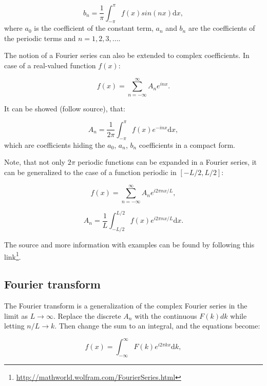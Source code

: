 \documentclass[12pt]{article}
\theoremstyle{plain}
\begin{document}
\begin{equation}
b_n = \frac{1}{\pi} \int_{-\pi}^{\pi} f(x) sin(nx) \text{d}x,
\end{equation}
where $a_0$ is the coefficient of the constant term, $a_n$ and $b_n$ are the coefficients of the periodic terms and $n=1,2,3, ...$.

The notion of a Fourier series can also be extended to complex coefficients. In case of a real-valued function $f(x)$:

\begin{equation}
f(x) = \sum_{n=-\infty}^{\infty} A_n e^{i n x}.
\end{equation}

It can be showed (follow source), that:

\begin{equation}
A_n = \frac{1}{2 \pi} \int_{-\pi}^{\pi} f(x) e^{-i n x} \text{d}x,
\end{equation}
which are coefficients hiding the $a_0$, $a_n$, $b_n$ coefficients in a compact form.

Note, that not only $2 \pi$ periodic functions can be expanded in a Fourier series, it can be generalized to the case of a function periodic in $[-L/2, L/2]$:

\begin{equation}
f(x) = \sum_{n=-\infty}^{\infty} A_n e^{i 2 \pi n x/L},
\end{equation}

\begin{equation}
A_n = \frac{1}{L} \int_{-L/2}^{L/2} f(x) e^{i 2 \pi n x/L} \text{d}x.
\end{equation}

The source and more information with examples can be found by following this link\footnote{\url{http://mathworld.wolfram.com/FourierSeries.html}}. 

\subsection{Fourier transform}

The Fourier transform is a generalization of the complex Fourier series in the limit as $L \rightarrow	\infty$. Replace the discrete $A_n$ with the continuous $F(k)dk$ while letting  $n/L \rightarrow k$. Then change the sum to an integral, and the equations become:

\begin{equation}
f(x) = \int_{-\infty}^{\infty} F(k) e^{i 2 \pi k x} \text{d}k,
\end{equation}
\end{document}
